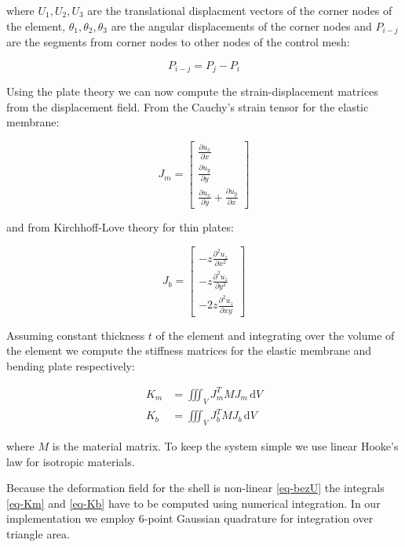 \documentclass{egpubl}
\newcommand{\deriv}[2]{\frac{\partial #1}{\partial #2}}
\begin{document}
\noindent
where $U_1, U_2, U_3$ are the translational displacment vectors of the
corner nodes of the element, $\theta_1, \theta_2, \theta_3$ are the angular
displacements of the corner nodes and $P_{i-j}$ are the segments from
corner nodes to other nodes of the control mesh:

\begin{equation}
    P_{i-j} = P_j-P_i %
\end{equation}

Using the plate theory we can now compute the strain-displacement matrices
from the displacement field. From the Cauchy's strain tensor for the
elastic membrane:

\begin{equation}\label{eq-cauchy}
    J_m = \left[ \begin{matrix}
        \deriv{u_x}{x} \\
        \deriv{u_y}{y} \\
        \deriv{u_x}{y} + \deriv{u_y}{x}
    \end{matrix} \right]
\end{equation}

\noindent
and from Kirchhoff-Love theory for thin plates:

\begin{equation}\label{eq-kirchhoff}
    J_b = \left[ \begin{matrix}
        - z \deriv{^2 u_z}{x^2} \\
        - z \deriv{^2 u_z}{y^2} \\
        - 2z \deriv{^2 u_z}{xy}
    \end{matrix} \right]
\end{equation}

Assuming constant thickness $t$ of the element and integrating over the volume
of the element we compute the stiffness matrices for the elastic membrane
and bending plate respectively:

\begin{align}
    \label{eq-Km}
    K_m & = \iiint_V J_m^T M J_m \, \mathrm{d} V \\
    \label{eq-Kb}
    K_b & = \iiint_V J_b^T M J_b \, \mathrm{d} V
\end{align}

\noindent
where $M$ is the material matrix. To keep the system simple we use linear
Hooke's law for isotropic materials.

Because the deformation field for the shell is non-linear \eqref{eq-bezU}
the integrals \eqref{eq-Km} and \eqref{eq-Kb} have to be computed using
numerical integration. In our implementation we employ 6-point Gaussian
quadrature for integration over triangle area.
\end{document}
